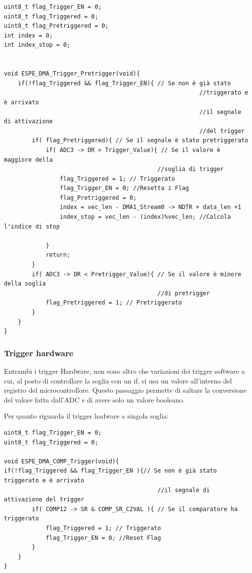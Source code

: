 \noindent
\begin{verbatim}
uint8_t flag_Trigger_EN = 0;
uint8_t flag_Triggered = 0;
uint8_t flag_Pretriggered = 0;
int index = 0;
int index_stop = 0;


void ESPE_DMA_Trigger_Pretrigger(void){
    if(!flag_Triggered && flag_Trigger_EN){ // Se non è già stato
                                                        //triggerato e è arrivato
                                                        //il segnale di attivazione
                                                        //del trigger
        if( flag_Pretriggered){ // Se il segnale è stato pretriggerato
            if( ADC3 -> DR > Trigger_Value){ // Se il valore è maggiore della
                                            //soglia di trigger
                flag_Triggered = 1; // Triggerato
                flag_Trigger_EN = 0; //Resetta i Flag
                flag_Pretriggered = 0;
                index = vec_len - DMA1_Stream0 -> NDTR + data_len +1
                index_stop = vec_len - (index)%vec_len; //Calcola l'indice di stop

            }
            return;
        }
        if( ADC3 -> DR < Pretrigger_Value){ // Se il valore è minore della soglia
                                            //di pretrigger
            flag_Pretriggered = 1; // Pretriggerato
        }
    }
}
\end{verbatim}

\subsubsection{Trigger hardware}
Entrambi i trigger Hardware, non sono altro che variazioni dei trigger software a cui, al posto di controllare la soglia con un if, si usa un valore all'interno del registro del microcontrollore. Questo passaggio permette di saltare la conversione del valore fatta dall'ADC e di avere solo un valore booleano.


Per quanto riguarda il trigger hadware a singola soglia:
\noindent
\begin{verbatim}
uint8_t flag_Trigger_EN = 0;
uint8_t flag_Triggered = 0;

void ESPE_DMA_COMP_Trigger(void){
if(!flag_Triggered && flag_Trigger_EN ){// Se non è già stato triggerato e è arrivato
                                            //il segnale di attivazione del trigger
        if( COMP12 -> SR & COMP_SR_C2VAL ){ // Se il comparatore ha triggerato
            flag_Triggered = 1; // Triggerato
            flag_Trigger_EN = 0; //Reset Flag
        }
    }
}
\end{verbatim}

